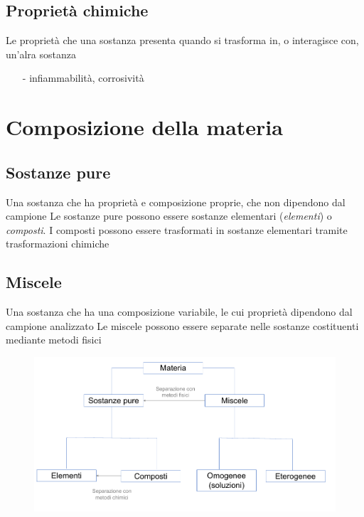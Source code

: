 \documentclass[a4paper,11pt]{report}
\begin{document}
\subsection*{Proprietà chimiche} 
Le proprietà che una sostanza presenta quando si trasforma in, o interagisce con, un'alra sostanza
\begin{itemize}
	\item[-] infiammabilità, corrosività
\end{itemize}
\section{Composizione della materia}
\subsection*{Sostanze pure}
Una sostanza che ha proprietà e composizione proprie, che non dipendono dal campione \newline
Le sostanze pure possono essere sostanze elementari (\emph{elementi}) o \emph{composti}. I composti possono essere trasformati in sostanze elementari tramite trasformazioni chimiche
\subsection*{Miscele}
Una sostanza che ha una composizione variabile, le cui proprietà dipendono dal campione analizzato \newline
Le miscele possono essere separate nelle sostanze costituenti mediante metodi fisici
\begin{figure}[H]
	\centering
	\includegraphics[width=\textwidth,height=\textheight,keepaspectratio]{immagini/grafico1}
	\label{fig:grafico1}
\end{figure}
\end{document}
